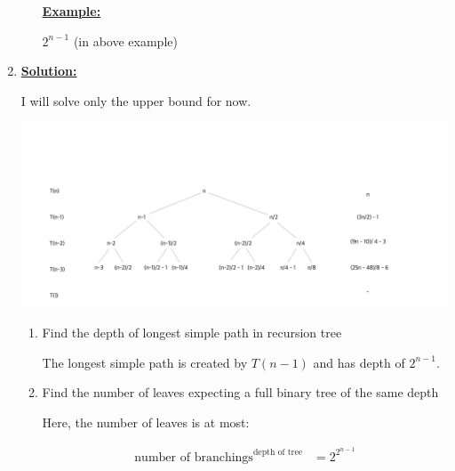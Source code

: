 \documentclass[12pt]{article}
\begin{document}
\begin{enumerate}[1.]
\begin{itemize}
        \bigskip

        \underline{\textbf{Example:}}

        $2^{n-1}$ (in above example)
    \end{itemize}

    \item

    \bigskip
    \setcounter{equation}{0}
    \underline{\textbf{Solution:}}

    \bigskip

    I will solve only the upper bound for now.

    \bigskip

    \begin{center}
    \includegraphics[width=\linewidth]{images/worksheet_0_solution_9.png}
    \end{center}

    \bigskip

    \begin{enumerate}[1.]
        \item Find the depth of longest simple path in recursion tree

        \bigskip

        \quad The longest simple path is created by $T(n-1)$ and has depth of $2^{n-1}$.

        \bigskip

        \item Find the number of leaves expecting a full binary tree of the same depth

        \bigskip

        \quad Here, the number of leaves is at most:

        \begin{align}
            \text{number of branchings}^{\text{depth of tree}} &= 2^{2^{n - 1}}
        \end{align}

        \bigskip


\end{enumerate}
\end{enumerate}
\end{document}
